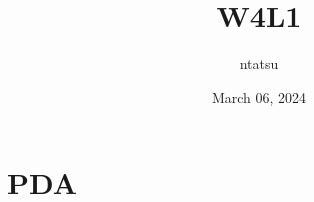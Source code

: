 \documentclass{article}
\title{W4L1}
\author{ntatsu}
\date{March 06, 2024}
\begin{document}
\maketitle

\section{PDA}
\end{document}
